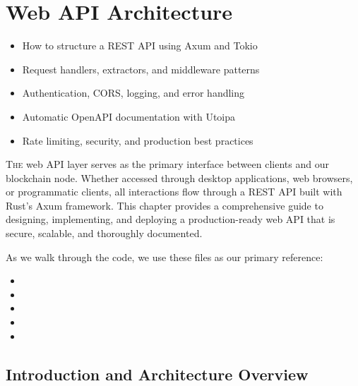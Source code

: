 
\chapter{Web API Architecture}
\label{ch:web-api}

\begin{learnbox}
\begin{itemize}
  \item How to structure a REST API using Axum and Tokio
  \item Request handlers, extractors, and middleware patterns
  \item Authentication, CORS, logging, and error handling
  \item Automatic OpenAPI documentation with Utoipa
  \item Rate limiting, security, and production best practices
\end{itemize}
\end{learnbox}

\lettrine{T}{he} web API layer serves as the primary interface between clients and our blockchain node. Whether accessed through desktop applications, web browsers, or programmatic clients, all interactions flow through a REST API built with Rust's Axum framework. This chapter provides a comprehensive guide to designing, implementing, and deploying a production-ready web API that is secure, scalable, and thoroughly documented.

As we walk through the code, we use these files as our primary reference:

\begin{itemize}
  \item {}
  \item {}
  \item {}
  \item {}
  \item {}
\end{itemize}

\section{Introduction and Architecture Overview}
\label{sec:web-api-intro}

